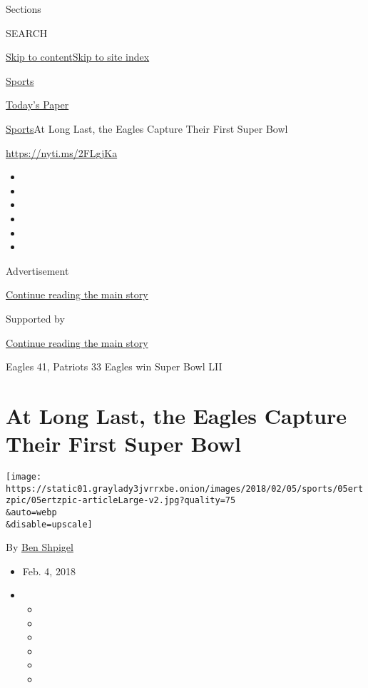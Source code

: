 Sections

SEARCH

\protect\hyperlink{site-content}{Skip to
content}\protect\hyperlink{site-index}{Skip to site index}

\href{https://www.nytimes3xbfgragh.onion/section/sports}{Sports}

\href{https://myaccount.nytimes3xbfgragh.onion/auth/login?response_type=cookie\&client_id=vi}{}

\href{https://www.nytimes3xbfgragh.onion/section/todayspaper}{Today's
Paper}

\href{/section/sports}{Sports}\textbar{}At Long Last, the Eagles Capture
Their First Super Bowl

\url{https://nyti.ms/2FLgjKa}

\begin{itemize}
\item
\item
\item
\item
\item
\item
\end{itemize}

Advertisement

\protect\hyperlink{after-top}{Continue reading the main story}

Supported by

\protect\hyperlink{after-sponsor}{Continue reading the main story}

Eagles 41, Patriots 33 \textbar{} Eagles win Super Bowl LII

\hypertarget{at-long-last-the-eagles-capture-their-first-super-bowl}{%
\section{At Long Last, the Eagles Capture Their First Super
Bowl}\label{at-long-last-the-eagles-capture-their-first-super-bowl}}

\texttt{[image: https://static01.graylady3jvrrxbe.onion/images/2018/02/05/sports/05ertzpic/05ertzpic-articleLarge-v2.jpg?quality=75\\\&auto=webp\\\&disable=upscale]}

By \href{https://www.nytimes3xbfgragh.onion/by/ben-shpigel}{Ben Shpigel}

\begin{itemize}
\item
  Feb. 4, 2018
\item
  \begin{itemize}
  \item
  \item
  \item
  \item
  \item
  \item
  \end{itemize}
\end{itemize}


